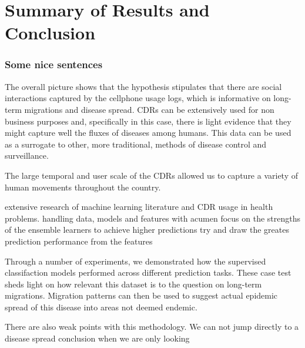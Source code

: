 
\chapter{Summary of Results and Conclusion}\label{ch:results_conclusion}




\subsection{Some nice sentences}


The overall picture shows that the hypothesis stipulates that there are social interactions captured by the cellphone usage logs, which is informative on long-term migrations and disease spread.
CDRs can be extensively used for non business purposes and, specifically in this case, there is light evidence that they might capture well the fluxes of diseases among humans.
This data can be used as a surrogate to other, more traditional, methods of disease control and surveillance.

The large temporal and user scale of the CDRs allowed us to capture a variety of human movements throughout the country.



extensive research of machine learning literature and CDR usage in health problems.
handling data, models and features with acumen
focus on the strengths of the ensemble learners to achieve higher predictions
try and draw the greates prediction performance from the features


Through a number of experiments, we demonstrated how the supervised classifaction models performed across different prediction tasks.
These case test sheds light on how relevant this dataset is to the question on long-term migrations.
Migration patterns can then be used to suggest actual epidemic spread of this disease into areas not deemed endemic.



There are also weak points with this methodology. We can not jump directly to a disease spread conclusion when we are only looking

